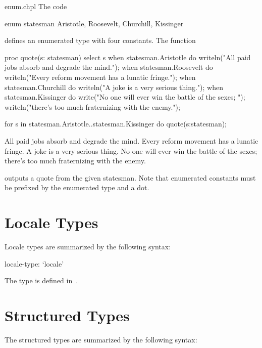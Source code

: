 \begin{chapelexample}{enum.chpl}
The code
\begin{chapel}
enum statesman { Aristotle, Roosevelt, Churchill, Kissinger }
\end{chapel}
defines an enumerated type with four constants.  The function
\begin{chapel}
proc quote(s: statesman) {
  select s {
    when statesman.Aristotle do
       writeln("All paid jobs absorb and degrade the mind.");
    when statesman.Roosevelt do
       writeln("Every reform movement has a lunatic fringe.");
    when statesman.Churchill do
       writeln("A joke is a very serious thing.");
    when statesman.Kissinger do
       { write("No one will ever win the battle of the sexes; ");
         writeln("there's too much fraternizing with the enemy."); }
  }
}
\end{chapel}
\begin{chapelnoprint}
for s in statesman.Aristotle..statesman.Kissinger do
  quote(s:statesman);
\end{chapelnoprint}
\begin{chapeloutput}
All paid jobs absorb and degrade the mind.
Every reform movement has a lunatic fringe.
A joke is a very serious thing.
No one will ever win the battle of the sexes; there's too much fraternizing with the enemy.
\end{chapeloutput}
outputs a quote from the given statesman.  Note that enumerated
constants must be prefixed by the enumerated type and a dot.
\end{chapelexample}


\section{Locale Types}
\label{Locale_Types}

Locale types are summarized by the following syntax:

\begin{syntax}
locale-type:
  `locale'
\end{syntax}

The  type is defined in~.


\section{Structured Types}
\label{Structured_Types}

The structured types are summarized by the following syntax:

